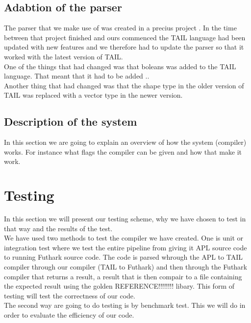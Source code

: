 \documentclass[11pt]{article}
\begin{document}
\subsection{Adabtion of the parser}
The parser that we make use of was created in a precius project \cite{APLACC}. In the time between that project finished and ours commenced the TAIL language had been updated with new features and we therefore had to update the parser so that it worked with the latest version of TAIL.\\

One of the things that had changed was that boleans was added to the TAIL language. That meant that it had to be added ..\\

Another thing that had changed was that the shape type in the older version of TAIL was replaced with a vector type in the newer version.\\

\subsection{Description of the system}
In this section we are going to explain an overview of how the system (compiler) works. For instance what flags the compiler can be given and how that make it work. 


\section{Testing}
In this section we will present our testing scheme, why we have chosen to test in that way and the results of the test.\\


We have used two methods to test the compiler we have created. One is unit or integration test where we test the entire pipeline from giving it APL source code to running Futhark source code. The code is parsed whrough the APL to TAIL compiler \cite{ElsmanDybdal:Array:2014} through our compiler (TAIL to Futhark) and then through the Futhark compiler \cite{TroelsHenriksen} that returns a result, a result that is then compair to a file containing the expected result using the golden REFERENCE!!!!!!!! %
libary. This form of testing will test the correctness of our code. \\

The second way are going to do testing is by benchmark test. This we will do in order to evaluate the efficiency of our code. 
\end{document}
